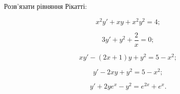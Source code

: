 Розв'язати рівняння Рікатті:
\begin{multicols}{2}
	\begin{problem}
		\[x^2 y' + xy +x^2y^2=4;\]
	\end{problem}

	\begin{problem}
		\[3y'+y^2+\frac2x=0;\]
	\end{problem}

	\begin{problem}
		\[xy'-(2x+1) y+y^2=5-x^2;\]
	\end{problem}

	\begin{problem}
		\[y'-2xy+y^2=5-x^2;\]
	\end{problem}
	
	\begin{problem}
		\[y'+2y e^x - y^2 = e^{2x} + e^x.\]
	\end{problem}
\end{multicols}